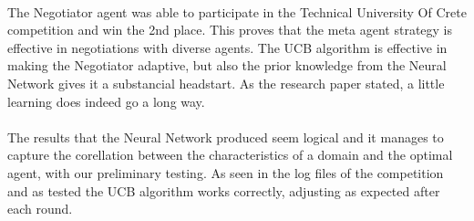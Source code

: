 \paragraph{}
 The Negotiator agent was able to participate in the Technical University Of Crete competition and win the 2nd place. This proves that the meta agent strategy is effective in negotiations with diverse agents.
The UCB algorithm is effective in making the Negotiator adaptive, but also the prior knowledge from the Neural Network gives it a substancial headstart. As the research paper 
\cite{meta_agent_paper} stated, a little learning does indeed go a long way.
\paragraph{}
The results that the Neural Network produced seem logical and it manages to capture the corellation between the characteristics of a domain and the optimal agent, with our preliminary testing. As seen in the log files
of the competition and as tested the UCB algorithm works correctly, adjusting as expected after each round.
\paragraph{}
